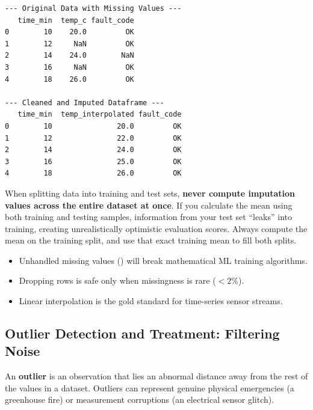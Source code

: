 \begin{lstlisting}[style=outputstyle]
--- Original Data with Missing Values ---
   time_min  temp_c fault_code
0        10    20.0         OK
1        12     NaN         OK
2        14    24.0        NaN
3        16     NaN         OK
4        18    26.0         OK

--- Cleaned and Imputed Dataframe ---
   time_min  temp_interpolated fault_code
0        10               20.0         OK
1        12               22.0         OK
2        14               24.0         OK
3        16               25.0         OK
4        18               26.0         OK
\end{lstlisting}

\begin{warning}
When splitting data into training and test sets, \textbf{never compute imputation values across the entire dataset at once}. If you calculate the mean using both training and testing samples, information from your test set ``leaks'' into training, creating unrealistically optimistic evaluation scores. Always compute the mean on the training split, and use that exact training mean to fill both splits.
\end{warning}

\begin{takeaways}
\begin{itemize}
    \item Unhandled missing values () will break mathematical ML training algorithms.
    \item Dropping rows is safe only when missingness is rare ($< 2\%$).
    \item Linear interpolation is the gold standard for time-series sensor streams.
\end{itemize}
\end{takeaways}

\subsection{Outlier Detection and Treatment: Filtering Noise}

\begin{keyidea}
An \textbf{outlier} is an observation that lies an abnormal distance away from the rest of the values in a dataset. Outliers can represent genuine physical emergencies (a greenhouse fire) or measurement corruptions (an electrical sensor glitch).
\end{keyidea}

